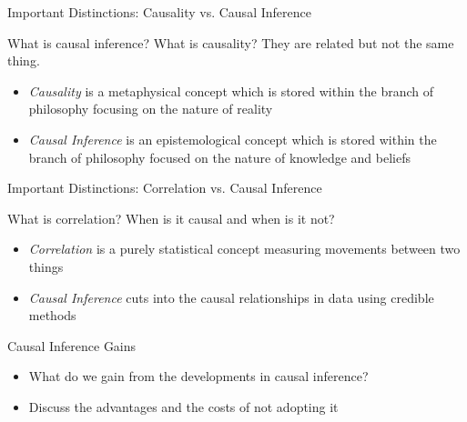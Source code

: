 \documentclass{beamer}
\begin{document}
\begin{frame}{Important Distinctions: Causality vs. Causal Inference}

What is causal inference?  What is causality?  They are related but not the same thing. 

\bigskip

\begin{itemize}
\item \emph{Causality} is a metaphysical concept which is stored within the branch of philosophy focusing on the nature of reality
\item \emph{Causal Inference} is an epistemological concept which is stored within the branch of philosophy focused on the nature of knowledge and beliefs
\end{itemize}
\end{frame}


\begin{frame}{Important Distinctions: Correlation vs. Causal Inference}

What is correlation?  When is it causal and when is it not? 

\bigskip

\begin{itemize}
\item \emph{Correlation} is a purely statistical concept measuring movements between two things
\item \emph{Causal Inference} cuts into the causal relationships in data using credible methods
\end{itemize}
\end{frame}

\begin{frame}{Causal Inference Gains}

\begin{itemize}

\item What do we gain from the developments in causal inference?
\item Discuss the advantages and the costs of not adopting it

\end{itemize}
\end{frame}


\end{document}

